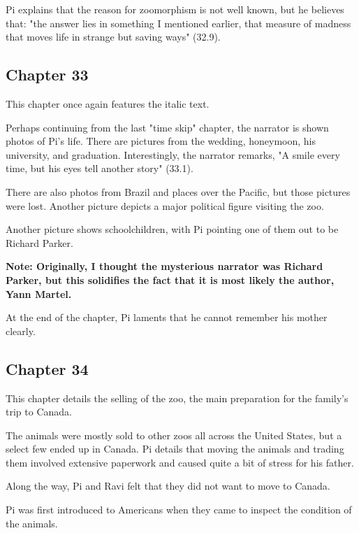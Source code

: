 \documentclass[11pt]{article}
\begin{document}
Pi explains that the reason for zoomorphism is not well known, but he believes that: "the answer lies in something I mentioned earlier, that measure of madness that moves life in strange but saving ways" (32.9).
\subsection{Chapter 33}
\label{sec:orgbdc75a3}
This chapter once again features the italic text.

Perhaps continuing from the last "time skip" chapter, the narrator is shown photos of Pi's life. There are pictures from the wedding, honeymoon, his university, and graduation. Interestingly, the narrator remarks, "A smile every time, but his eyes tell another story" (33.1).

There are also photos from Brazil and places over the Pacific, but those pictures were lost. Another picture depicts a major political figure visiting the zoo.

Another picture shows schoolchildren, with Pi pointing one of them out to be Richard Parker.

\textbf{Note: Originally, I thought the mysterious narrator was Richard Parker, but this solidifies the fact that it is most likely the author, Yann Martel.}

At the end of the chapter, Pi laments that he cannot remember his mother clearly.
\subsection{Chapter 34}
\label{sec:org5add0b8}
This chapter details the selling of the zoo, the main preparation for the family's trip to Canada.

The animals were mostly sold to other zoos all across the United States, but a select few ended up in Canada. Pi details that moving the animals and trading them involved extensive paperwork and caused quite a bit of stress for his father.

Along the way, Pi and Ravi felt that they did not want to move to Canada.

Pi was first introduced to Americans when they came to inspect the condition of the animals.
\end{document}
